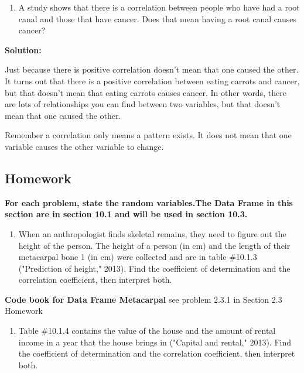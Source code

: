 \documentclass[
]{book}
\providecommand{\tightlist}{%
  \setlength{\itemsep}{0pt}\setlength{\parskip}{0pt}}
\begin{document}
\begin{enumerate}
\def\labelenumi{\alph{enumi}.}
\setcounter{enumi}{1}
\tightlist
\item
  A study shows that there is a correlation between people who have had a root canal and those that have cancer. Does that mean having a root canal causes cancer?
\end{enumerate}

\textbf{Solution:}

Just because there is positive correlation doesn't mean that one caused the other. It turns out that there is a positive correlation between eating carrots and cancer, but that doesn't mean that eating carrots causes cancer. In other words, there are lots of relationships you can find between two variables, but that doesn't mean that one caused the other.

Remember a correlation only means a pattern exists. It does not mean that one variable causes the other variable to change.

\hypertarget{homework-26}{%
\subsection{Homework}\label{homework-26}}

\textbf{For each problem, state the random variables.The Data Frame in this section are in section 10.1 and will be used in section 10.3.}

\begin{enumerate}
\def\labelenumi{\arabic{enumi}.}
\tightlist
\item
  When an anthropologist finds skeletal remains, they need to figure out the height of the person. The height of a person (in cm) and the length of their metacarpal bone 1 (in cm) were collected and are in table \#10.1.3 ("Prediction of height," 2013). Find the coefficient of determination and the correlation coefficient, then interpret both.
\end{enumerate}

\textbf{Code book for Data Frame Metacarpal} see problem 2.3.1 in Section 2.3 Homework

\begin{enumerate}
\def\labelenumi{\arabic{enumi}.}
\setcounter{enumi}{1}
\tightlist
\item
  Table \#10.1.4 contains the value of the house and the amount of rental income in a year that the house brings in ("Capital and rental," 2013). Find the coefficient of determination and the correlation coefficient, then interpret both.
\end{enumerate}
\end{document}
